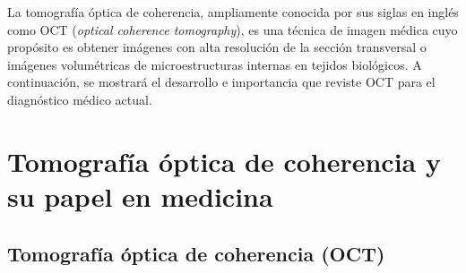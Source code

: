 
La tomografía óptica de coherencia, ampliamente conocida por sus siglas en inglés como OCT (\textit{optical coherence tomography}), es una técnica de imagen médica cuyo propósito es obtener imágenes con alta resolución de la sección transversal o imágenes volumétricas de microestructuras internas en tejidos biológicos. A continuación, se mostrará el desarrollo e importancia que reviste OCT para el diagnóstico médico actual.

\section{Tomografía óptica de coherencia y su papel en medicina}

\subsection{Tomografía óptica de coherencia (OCT)}

